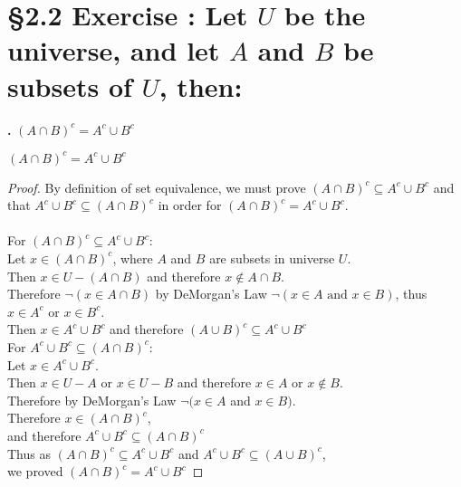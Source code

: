 \documentclass[a4paper,11pt]{article}
\begin{document}
\section*{\S 2.2 Exercise : Let \(U\) be the universe, and let \(A\) and \(B\) be subsets of \(U\), then: }
\textbf{.}
\((A \cap B)^c = A^c \cup B^c\)
\begin{theorem5}
\((A \cap B)^c = A^c \cup B^c\)
\begin{proof}
By definition of set equivalence, we must prove \((A \cap B)^c \subseteq A^c \cup B^c\) 
and that \(A^c \cup B^c \subseteq (A \cap B)^c\) in order for  \((A \cap B)^c = A^c \cup B^c\).\\\\
For \((A \cap B)^c \subseteq A^c \cup B^c\):\\
Let \(x \in (A \cap B)^c\), where \(A\) and \(B\) are subsets in universe 
\(U\).\\
Then \(x \in U - (A \cap B)\) and therefore \(x \notin A \cap B\).\\
Therefore \(\neg (x \in A \cap B)\) by DeMorgan's Law \(\neg (x \in A \text{ and } x \in 
B)\), thus \(x \in A^c\) or \(x \in B^c\).\\
Then \(x \in A^c \cup B^c\) and therefore \((A \cup B)^c \subseteq A^c \cup 
B^c\)\\

\noindent For \(A^c \cup B^c \subseteq (A \cap B)^c\):\\
Let \(x \in A^c \cup B^c\).\\
Then \(x \in U - A\) or \(x \in U - B\) and therefore \(x \in A\) or \(x \notin 
B\).\\
Therefore by DeMorgan's Law \(\neg (x \in A\) and \(x \in B)\).\\
Therefore \(x \in (A \cap B)^c\),\\
and therefore \(A^c \cup B^c \subseteq (A \cap B)^c\)\\

\noindent Thus as \((A \cap B)^c \subseteq A^c \cup B^c\) and \(A^c \cup B^c \subseteq (A \cup 
B)^c\),\\ we proved \((A \cap B)^c = A^c \cup B^c\)
\end{proof}
\end{theorem5}

\newpage

\setcounter{ProblemCounter}{8}
\setcounter{SubsectionCounter}{8}
\end{document}

